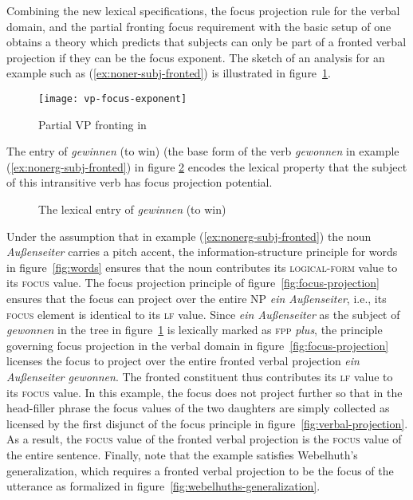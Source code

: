 \documentclass[output=paper]{langsci/langscibook}
\begin{document}
Combining the new lexical specifications, the focus projection rule
for the verbal domain, and the partial fronting focus requirement with
the basic setup of \cite{deKuthy2002a} one obtains a theory which
predicts that subjects can only be part of a fronted verbal projection
if they can be the focus exponent. The sketch of an analysis for an
example such as (\ref{ex:noner-subj-fronted}) is illustrated in
figure~\ref{fig:focus-exponent}.
  \begin{figure}[htb]
    \centering
    \texttt{[image: vp-focus-exponent]}
    \caption{Partial VP fronting in \cite{dKM2003a}}
    \label{fig:focus-exponent}
  \end{figure}
  The entry of \textit{gewinnen} (to win) (the base form of the verb
  \textit{gewonnen} in example (\ref{ex:nonerg-subj-fronted}) in
  figure \ref{fig:lex-entry} encodes the lexical property that the
  subject of this intransitive verb has focus projection potential.
\begin{figure}[htb!]
%
\begin{center}
  \begin{avm}
  \end{avm}
\caption{The lexical entry of \textit{gewinnen} (to win)}
\label{fig:lex-entry}
\end{center}\unskip
\end{figure}

Under the assumption that in example (\ref{ex:nonerg-subj-fronted}) the
noun \textit{Außenseiter} carries a pitch accent, the
information-structure principle for words in figure~\ref{fig:words} ensures that the noun
contributes its \textsc{logical-form} value to its \textsc{focus}
value. The focus projection principle of
figure~\ref{fig:focus-projection} ensures that the focus can
project over the entire NP \textit{ein Außenseiter}, i.e., its
\textsc{focus} element is identical to its \textsc{lf} value. Since
\textit{ein Außenseiter} as the subject of \textit{gewonnen} in the
tree in figure~\ref{fig:focus-exponent} is lexically marked as
\textsc{fpp} \textit{plus}, the principle governing focus projection
in the verbal domain in figure~\ref{fig:focus-projection}
licenses the focus to project over the entire fronted verbal
projection \textit{ein Außenseiter gewonnen}. The fronted constituent
thus contributes its \textsc{lf} value to its \textsc{focus} value. In
this example, the focus does not project further so that in the
head-filler phrase the focus values of the two daughters are simply
collected as licensed by the first disjunct of the focus principle in
figure~\ref{fig:verbal-projection}. As a result, the
\textsc{focus} value of the fronted verbal projection is the
\textsc{focus} value of the entire sentence. Finally, note that the
example satisfies Webelhuth's generalization, which requires a fronted
verbal projection to be the focus of the utterance as formalized in
figure~\ref{fig:webelhuths-generalization}.
\end{document}
